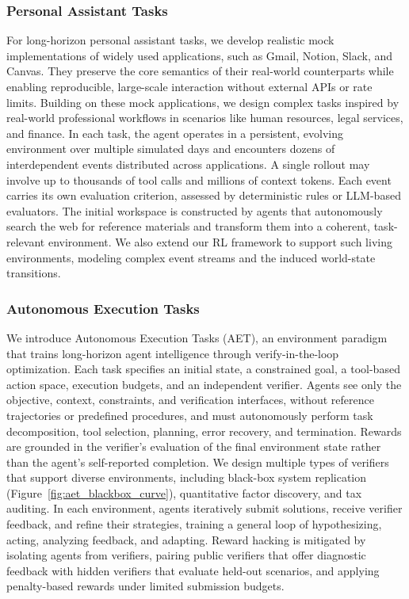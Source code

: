 \subsubsection{Personal Assistant Tasks}
\label{sec:week-task}
For long-horizon personal assistant tasks, we develop realistic mock implementations of widely used applications, such as Gmail, Notion, Slack, and Canvas. They preserve the core semantics of their real-world counterparts while enabling reproducible, large-scale interaction without external APIs or rate limits. Building on these mock applications, we design complex tasks inspired by real-world professional workflows in scenarios like human resources, legal services, and finance. In each task, the agent operates in a persistent, evolving environment over multiple simulated days and encounters dozens of interdependent events distributed across applications. A single rollout may involve up to thousands of tool calls and millions of context tokens. Each event carries its own evaluation criterion, assessed by deterministic rules or LLM-based evaluators. The initial workspace is constructed by agents that autonomously search the web for reference materials and transform them into a coherent, task-relevant environment. We also extend our RL framework to support such living environments, modeling complex event streams and the induced world-state transitions.



\subsubsection{Autonomous Execution Tasks}
\label{sec:post-envs-autonomous}

We introduce Autonomous Execution Tasks (AET), an environment paradigm that trains long-horizon agent intelligence through verify-in-the-loop optimization. Each task specifies an initial state, a constrained goal, a tool-based action space, execution budgets, and an independent verifier. Agents see only the objective, context, constraints, and verification interfaces, without reference trajectories or predefined procedures, and must autonomously perform task decomposition, tool selection, planning, error recovery, and termination. Rewards are grounded in the verifier's evaluation of the final environment state rather than the agent's self-reported completion. We design multiple types of verifiers that support diverse environments, including black-box system replication (Figure~\ref{fig:aet_blackbox_curve}), quantitative factor discovery, and tax auditing. In each environment, agents iteratively submit solutions, receive verifier feedback, and refine their strategies, training a general loop of hypothesizing, acting, analyzing feedback, and adapting. Reward hacking is mitigated by isolating agents from verifiers, pairing public verifiers that offer diagnostic feedback with hidden verifiers that evaluate held-out scenarios, and applying penalty-based rewards under limited submission budgets.











